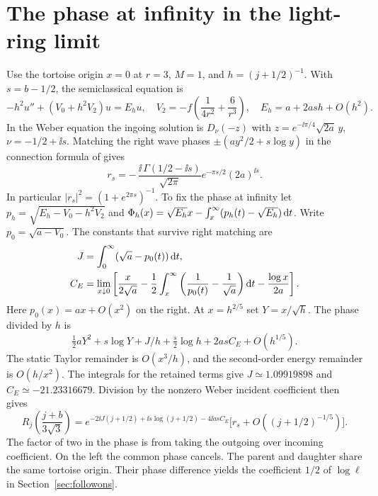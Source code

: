 \section{The phase at infinity in the light-ring limit}
\label{app:phase}

Use the tortoise origin \(x=0\) at \(r=3\), \(M=1\), and
\(h=(j+1/2)^{-1}\). With \(s=b-1/2\), the semiclassical equation is
\[
 -h^2 u''+(V_0+h^2 V_2)u=E_h u,\quad
 V_2=-f\left(\frac{1}{4r^2}+\frac{6}{r^3}\right),
 \quad E_h=a+2as h+O(h^2).
\]
In the Weber equation the ingoing solution is \(D_\nu(-z)\) with
\(z=e^{-\ii\pi/4}\sqrt{2a}\,y\), \(\nu=-1/2+\ii s\).
Matching the right wave phases \(\pm(ay^2/2+s\log y)\) in the
connection formula of \cite{dlmf} gives
\[
 r_s=-\,\frac{\ii\,\Gamma(1/2-\ii s)}{\sqrt{2\pi}}
      e^{-\pi s/2}(2a)^{\ii s}.
\]
In particular \(|r_s|^2=(1+e^{2\pi s})^{-1}\).
To fix the phase at infinity let
\(p_h=\sqrt{E_h-V_0-h^2 V_2}\) and
\(\Phi_h(x)=\sqrt{E_h}x-\int_x^\infty(p_h(t)-\sqrt{E_h})\,\mathrm{d} t\).
Write \(p_0=\sqrt{a-V_0}\). The constants that survive right matching are
\[
\begin{split}
 J&=\int_0^\infty(\sqrt a-p_0(t))\,\mathrm{d} t,\\
 C_E&=\lim_{x\downarrow0}
 \left[\frac{x}{2\sqrt a}
   -\frac12\int_x^\infty\left(\frac1{p_0(t)}-\frac1{\sqrt a}\right)\mathrm{d} t
   -\frac{\log x}{2a}\right].
\end{split}
\]
Here \(p_0(x)=a x+O(x^2)\) on the right. At \(x=h^{2/5}\) set
\(Y=x/\sqrt h\). The phase divided by \(h\) is
\[
 \tfrac12 aY^2+s\log Y+J/h+\tfrac{s}{2}\log h
    + 2as C_E+O(h^{1/5}).
\]
The static Taylor remainder is \(O(x^3/h)\), and the second-order
energy remainder is \(O(h/x^2)\). The integrals for the retained
terms give \(J\simeq1.09919898\) and \(C_E\simeq-21.23316679\).
Division by the nonzero Weber incident coefficient then gives
\[
 R_j\!\left(\frac{j+b}{3\sqrt3}\right)
   = e^{-2\ii J(j+1/2)+\ii s\log(j+1/2)-4\ii a s C_E}
     \big[r_s+O((j+1/2)^{-1/5})\big].
\]
The factor of two in the phase is from taking the outgoing over
incoming coefficient. On the left the common phase cancels. The
parent and daughter share the same tortoise origin. Their phase
difference yields the coefficient \(1/2\) of \(\log\ell\) in
Section~\ref{sec:followons}.
